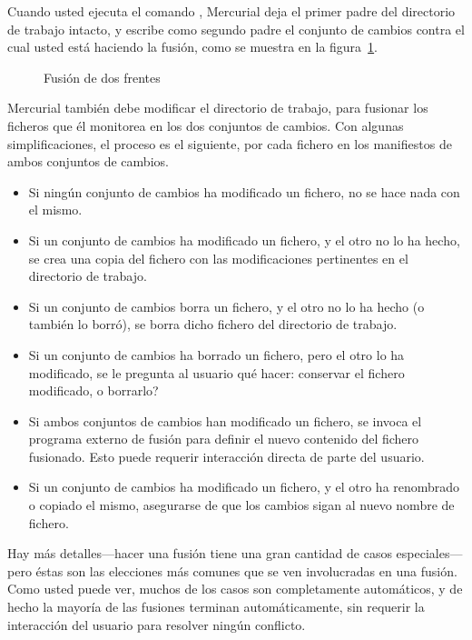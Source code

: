 Cuando usted ejecuta el comando , Mercurial deja el
primer padre del directorio de trabajo intacto, y escribe como segundo
padre el conjunto de cambios contra el cual usted está haciendo la
fusión, como se muestra en la figura~\ref{fig:concepts:wdir-merge}.

\begin{figure}[ht]
  \centering
  \caption{Fusión de dos frentes}
  \label{fig:concepts:wdir-merge}
\end{figure}

Mercurial también debe modificar el directorio de trabajo, para
fusionar los ficheros que él monitorea en los dos conjuntos de
cambios. Con algunas simplificaciones, el proceso es el siguiente, por
cada fichero en los manifiestos de ambos conjuntos de cambios.
\begin{itemize}
\item Si ningún conjunto de cambios ha modificado un fichero, no se
    hace nada con el mismo.
\item Si un conjunto de cambios ha modificado un fichero, y el otro no
    lo ha hecho, se crea una copia del fichero con las modificaciones
    pertinentes en el directorio de trabajo.
\item Si un conjunto de cambios borra un fichero, y el otro no lo ha
    hecho (o también lo borró), se borra dicho fichero del directorio
    de trabajo.
\item Si un conjunto de cambios ha borrado un fichero, pero el otro lo ha
    modificado, se le pregunta al usuario qué hacer: conservar el
    fichero modificado, o borrarlo?
\item Si ambos conjuntos de cambios han modificado un fichero, se
    invoca el programa externo de fusión para definir el nuevo
    contenido del fichero fusionado. Esto puede requerir interacción
    directa de parte del usuario.
\item Si un conjunto de cambios ha modificado un fichero, y el otro ha
    renombrado o copiado el mismo, asegurarse de que los cambios sigan
    al nuevo nombre de fichero.
\end{itemize}
Hay más detalles---hacer una fusión tiene una gran cantidad de casos
especiales---pero éstas son las elecciones más comunes que se ven
involucradas en una fusión. Como usted puede ver, muchos de los casos
son completamente automáticos, y de hecho la mayoría de las fusiones
terminan automáticamente, sin requerir la interacción del usuario para
resolver ningún conflicto.

